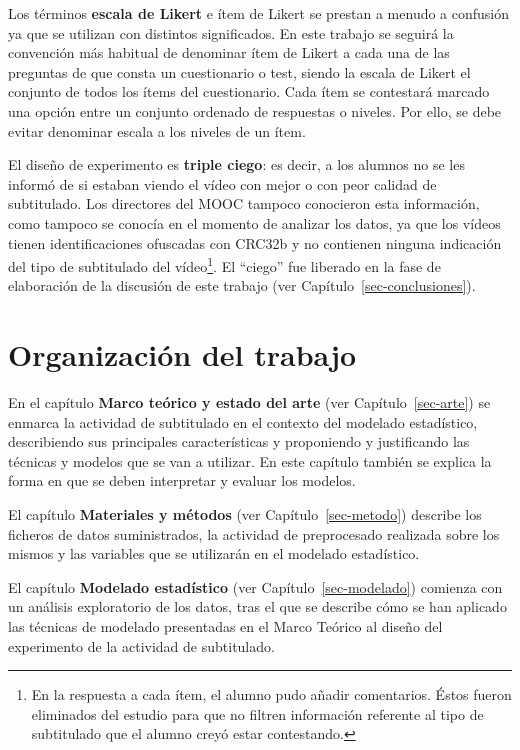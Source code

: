 \documentclass[
  12pt,
  a4paper,
  extrafontsizes,
  onecolumn,
  openright,
  table]{memoir}
\begin{document}
Los términos \textbf{escala de Likert} e ítem de Likert se prestan a
menudo a confusión ya que se utilizan con distintos significados. En
este trabajo se seguirá la convención más habitual
\autocite[ver][]{uebersax2006} de denominar ítem de Likert a cada una de
las preguntas de que consta un cuestionario o test, siendo la escala de
Likert el conjunto de todos los ítems del cuestionario. Cada ítem se
contestará marcado una opción entre un conjunto ordenado de respuestas o
niveles. Por ello, se debe evitar denominar escala a los niveles de un
ítem.

El diseño de experimento es \textbf{triple ciego}: es decir, a los
alumnos no se les informó de si estaban viendo el vídeo con mejor o con
peor calidad de subtitulado. Los directores del MOOC tampoco conocieron
esta información, como tampoco se conocía en el momento de analizar los
datos, ya que los vídeos tienen identificaciones ofuscadas con CRC32b y
no contienen ninguna indicación del tipo de subtitulado del
vídeo\footnote{En la respuesta a cada ítem, el alumno pudo añadir
  comentarios. Éstos fueron eliminados del estudio para que no filtren
  información referente al tipo de subtitulado que el alumno creyó estar
  contestando.}. El \enquote{ciego} fue liberado en la fase de
elaboración de la discusión de este trabajo (ver
Capítulo~\ref{sec-conclusiones}).

\hypertarget{organizaciuxf3n-del-trabajo}{%
\section{Organización del trabajo}\label{organizaciuxf3n-del-trabajo}}

En el capítulo \textbf{Marco teórico y estado del arte} (ver
Capítulo~\ref{sec-arte}) se enmarca la actividad de subtitulado en el
contexto del modelado estadístico, describiendo sus principales
características y proponiendo y justificando las técnicas y modelos que
se van a utilizar. En este capítulo también se explica la forma en que
se deben interpretar y evaluar los modelos.

El capítulo \textbf{Materiales y métodos} (ver
Capítulo~\ref{sec-metodo}) describe los ficheros de datos suministrados,
la actividad de preprocesado realizada sobre los mismos y las variables
que se utilizarán en el modelado estadístico.

El capítulo \textbf{Modelado estadístico} (ver
Capítulo~\ref{sec-modelado}) comienza con un análisis exploratorio de
los datos, tras el que se describe cómo se han aplicado las técnicas de
modelado presentadas en el Marco Teórico al diseño del experimento de la
actividad de subtitulado.
\end{document}
